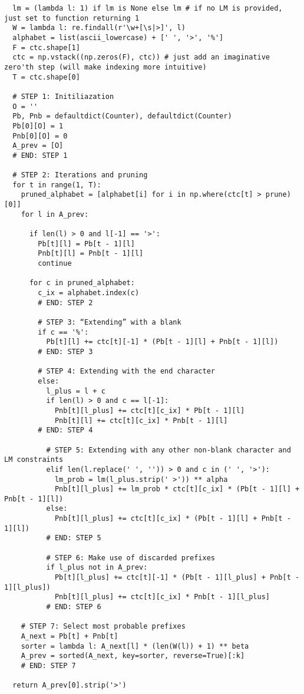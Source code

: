 {{\begin{lstlisting}
  lm = (lambda l: 1) if lm is None else lm # if no LM is provided, just set to function returning 1
  W = lambda l: re.findall(r'\w+[\s|>]', l)
  alphabet = list(ascii_lowercase) + [' ', '>', '%']
  F = ctc.shape[1]
  ctc = np.vstack((np.zeros(F), ctc)) # just add an imaginative zero'th step (will make indexing more intuitive)
  T = ctc.shape[0]

  # STEP 1: Initiliazation
  O = ''
  Pb, Pnb = defaultdict(Counter), defaultdict(Counter)
  Pb[0][O] = 1
  Pnb[0][O] = 0
  A_prev = [O]
  # END: STEP 1

  # STEP 2: Iterations and pruning
  for t in range(1, T):
    pruned_alphabet = [alphabet[i] for i in np.where(ctc[t] > prune)[0]]
    for l in A_prev:
      
      if len(l) > 0 and l[-1] == '>':
        Pb[t][l] = Pb[t - 1][l]
        Pnb[t][l] = Pnb[t - 1][l]
        continue  

      for c in pruned_alphabet:
        c_ix = alphabet.index(c)
        # END: STEP 2
        
        # STEP 3: “Extending” with a blank
        if c == '%':
          Pb[t][l] += ctc[t][-1] * (Pb[t - 1][l] + Pnb[t - 1][l])
        # END: STEP 3
        
        # STEP 4: Extending with the end character
        else:
          l_plus = l + c
          if len(l) > 0 and c == l[-1]:
            Pnb[t][l_plus] += ctc[t][c_ix] * Pb[t - 1][l]
            Pnb[t][l] += ctc[t][c_ix] * Pnb[t - 1][l]
        # END: STEP 4

          # STEP 5: Extending with any other non-blank character and LM constraints
          elif len(l.replace(' ', '')) > 0 and c in (' ', '>'):
            lm_prob = lm(l_plus.strip(' >')) ** alpha
            Pnb[t][l_plus] += lm_prob * ctc[t][c_ix] * (Pb[t - 1][l] + Pnb[t - 1][l])
          else:
            Pnb[t][l_plus] += ctc[t][c_ix] * (Pb[t - 1][l] + Pnb[t - 1][l])
          # END: STEP 5

          # STEP 6: Make use of discarded prefixes
          if l_plus not in A_prev:
            Pb[t][l_plus] += ctc[t][-1] * (Pb[t - 1][l_plus] + Pnb[t - 1][l_plus])
            Pnb[t][l_plus] += ctc[t][c_ix] * Pnb[t - 1][l_plus]
          # END: STEP 6

    # STEP 7: Select most probable prefixes
    A_next = Pb[t] + Pnb[t]
    sorter = lambda l: A_next[l] * (len(W(l)) + 1) ** beta
    A_prev = sorted(A_next, key=sorter, reverse=True)[:k]
    # END: STEP 7

  return A_prev[0].strip('>')


\end{lstlisting}}}
